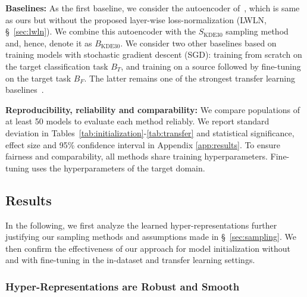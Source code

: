 \documentclass{article}
\begin{document}
%
\textbf{Baselines:}
As the first baseline, we consider the autoencoder of~\citep{schurholtSelfSupervisedRepresentationLearning2021}, which is same as ours but without the proposed layer-wise loss-normalization (LWLN, \S~\ref{sec:lwln}). We combine this autoencoder with the $S_\text{KDE30}$ sampling method and, hence, denote it as $B_{\text{KDE}30}$.
We consider two other baselines based on training models with stochastic gradient descent (SGD): training from scratch on the target classification task $B_T$, and training on a source followed by fine-tuning on the target task $B_F$. The latter remains one of the strongest transfer learning baselines~\citep{chen2019closer,dhillon2019baseline,kolesnikov2020big}.
%

\textbf{Reproducibility, reliability and comparability:}
We compare populations of at least 50 models to evaluate each method reliably.
We report standard deviation in Tables~\ref{tab:initialization}-\ref{tab:transfer} and statistical significance, effect size and 95\% confidence interval in Appendix \ref{app:results}. 
To ensure fairness and comparability, all methods share training hyperparameters. 
Fine-tuning uses the hyperparameters of the target domain. 

%
\subsection{Results}
\label{sec:results}
In the following, we first analyze the learned hyper-representations further justifying our sampling methods and assumptions made in \S~\ref{sec:sampling}. %
We then confirm the effectiveness of our approach for model initialization without and with fine-tuning in the in-dataset and transfer learning settings.
%
\subsubsection{Hyper-Representations are Robust and Smooth}
\label{sec:analysis}
\end{document}
